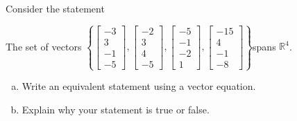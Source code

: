 
\begin{exerciseStatement}


Consider the statement 
\begin{center}\begin{minipage}{0.8\textwidth}
 The set of vectors \( \left\{ \left[\begin{array}{c}
-3 \\
3 \\
-1 \\
-5
\end{array}\right] , \left[\begin{array}{c}
-2 \\
3 \\
4 \\
-5
\end{array}\right] , \left[\begin{array}{c}
-5 \\
-1 \\
-2 \\
1
\end{array}\right] , \left[\begin{array}{c}
-15 \\
4 \\
-1 \\
-8
\end{array}\right] \right\} \)spans \(\mathbb{R}^4\). 
\end{minipage}\end{center}
    


\begin{enumerate}[(a)]
\item  Write an equivalent statement using a vector equation.
\item  Explain why your statement is true or false.
\end{enumerate}
    
\end{exerciseStatement}
    
